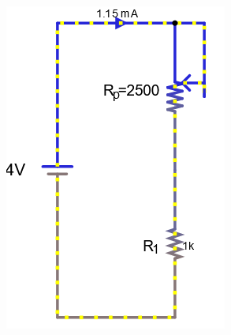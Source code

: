 \documentclass[a4paper]{article}
\begin{document}
\begin{figure}[H]
\begin{subfigure}{0.333\textwidth}
        \includegraphics[width=.9\linewidth]{amp4}
    \end{subfigure}
    \begin{subfigure}{0.333\textwidth}

\end{subfigure}
\end{figure}
\end{document}
